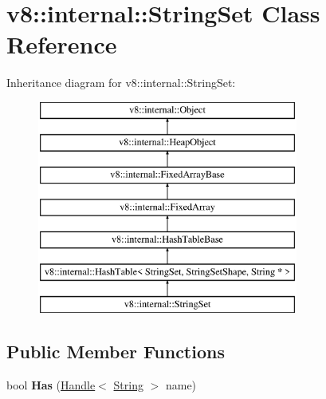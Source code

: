 \hypertarget{classv8_1_1internal_1_1_string_set}{}\section{v8\+:\+:internal\+:\+:String\+Set Class Reference}
\label{classv8_1_1internal_1_1_string_set}
Inheritance diagram for v8\+:\+:internal\+:\+:String\+Set\+:\begin{figure}[H]
\begin{center}
\leavevmode
\includegraphics[height=7.000000cm]{classv8_1_1internal_1_1_string_set}
\end{center}
\end{figure}
\subsection*{Public Member Functions}
\begin{DoxyCompactItemize}
\item 
bool {\bfseries Has} (\hyperlink{classv8_1_1internal_1_1_handle}{Handle}$<$ \hyperlink{classv8_1_1internal_1_1_string}{String} $>$ name)\hypertarget{classv8_1_1internal_1_1_string_set_ad8c522470999655a5025a0afbe863813}{}\label{classv8_1_1internal_1_1_string_set_ad8c522470999655a5025a0afbe863813}

\end{DoxyCompactItemize}
